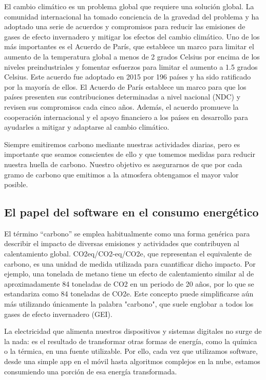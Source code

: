 \documentclass[12pt,a4paper]{report}
\begin{document}
El cambio climático es un problema global que requiere una solución global. La
comunidad internacional ha tomado conciencia de la gravedad del problema y ha
adoptado una serie de acuerdos y compromisos para reducir las emisiones de
gases de efecto invernadero y mitigar los efectos del cambio climático. Uno de
los más importantes es el Acuerdo de París, que establece un marco para limitar
el aumento de la temperatura global a menos de 2 grados Celsius por encima de
los niveles preindustriales y fomentar esfuerzos para limitar el aumento a 1.5
grados Celsius. Este acuerdo fue adoptado en 2015 por 196 países y ha sido
ratificado por la mayoría de ellos. El Acuerdo de París establece un marco para
que los países presenten sus contribuciones determinadas a nivel nacional (NDC)
y revisen sus compromisos cada cinco años. Además, el acuerdo promueve la
cooperación internacional y el apoyo financiero a los países en desarrollo para
ayudarles a mitigar y adaptarse al cambio climático.

Siempre emitiremos carbono mediante nuestras actividades diarias, pero es
importante que seamos conscientes de ello y que tomemos medidas para reducir
nuestra huella de carbono. Nuestro objetivo es asegurarnos de que por cada
gramo de carbono que emitimos a la atmosfera obtengamos el mayor valor posible.

\subsection{El papel del software en el consumo energético}

El término ``carbono'' se emplea habitualmente como una forma genérica para
describir el impacto de diversas emisiones y actividades que contribuyen al
calentamiento global. CO2eq/CO2-eq/CO2e, que representan el equivalente de
carbono, es una unidad de medida utilizada para cuantificar dicho impacto. Por
ejemplo, una tonelada de metano tiene un efecto de calentamiento similar al de
aproximadamente 84 toneladas de CO2 en un periodo de 20 años, por lo que se
estandariza como 84 toneladas de CO2e. Este concepto puede simplificarse aún
más utilizando únicamente la palabra "carbono", que suele englobar a todos los
gases de efecto invernadero (GEI).

La electricidad que alimenta nuestros dispositivos y sistemas digitales no
surge de la nada: es el resultado de transformar otras formas de energía, como
la química o la térmica, en una fuente utilizable. Por ello, cada vez que
utilizamos software, desde una simple app en el móvil hasta algoritmos
complejos en la nube, estamos consumiendo una porción de esa energía
transformada.
\end{document}
